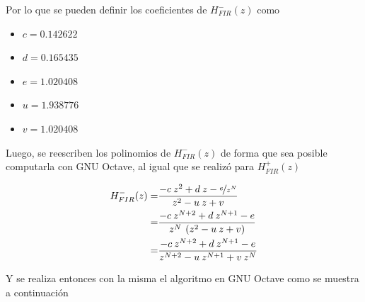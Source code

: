 \message{ !name(../main.tex)}\documentclass[journal,transmag]{IEEEtran}
\begin{document}
    Por lo que se pueden definir los coeficientes de $H_{FIR}^{-}(z)$ como

    \begin{itemize}
      \item $c = 0.142622$
      \item $d = 0.165435$
      \item $e = 1.020408$
      \item $u = 1.938776$
      \item $v = 1.020408$
    \end{itemize}

    Luego, se reescriben los polinomios de $H_{FIR}^{-}(z)$ de forma que sea posible computarla con GNU Octave, al igual que se realizó para $H_{FIR}^{+}(z)$

    \begin{align}
      H_{FIR}^{-}(z) =& \frac{-c \: z^{2} + d \: z - \nicefrac{e}{z^{N}}}{z^{2} - u \: z + v} \nonumber \\
      =& \frac{-c \: z^{N+2} + d \: z^{N+1} - e}{z^{N} \: \left( z^{2} - u \: z + v \right)} \nonumber \\
      =& \frac{-c \: z^{N+2} + d \: z^{N+1} - e}{z^{N+2} - u \: z^{N+1} + v \: z^{N}}
    \end{align}

    Y se realiza entonces con la misma el algoritmo en GNU Octave como se muestra a continuación

    


\end{document}
